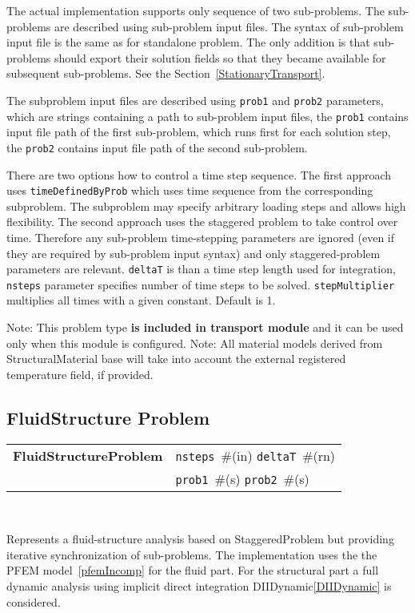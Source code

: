 \documentclass[a4paper]{article}
\makeatletter
\newcommand{\param}[1]{\texttt{#1}} %
\newcommand{\field}[2]{\param{#1}~\#{\tiny(#2)}} %
\newcommand{\entKeywordInst}[1]{\textbf{#1}} %
\newenvironment{record}[1][]{\begin{tabular}{|ll}}{\end{tabular}\\}
\newcommand{\recentry}[2]{{#1}&{#2}\\}
\newcounter{rcc}
\newenvironment{record}[1][\textwidth]{\setcounter{rcc}{0}\begin{tabular*}{#1}{|ll@{\extracolsep{\fill}}r}}{\end{tabular*}\\}
\newcommand{\recentry}[2]{\ifthenelse{\value{rcc}>0}{&$\backslash$ \\}{\setcounter{rcc}{1}}{#1}&{#2}}
\makeatother
\begin{document}
The actual implementation supports only sequence of two sub-problems.
The sub-problems are described using sub-problem input files. The
syntax of sub-problem input file is the same as for standalone
problem. The only addition is that sub-problems should export their
solution fields so that they became available for subsequent
sub-problems. See the Section~\ref{StationaryTransport}.

The subproblem input files are described using
\param{prob1} and \param{prob2} parameters, which are strings
containing a path to sub-problem input files, the \param{prob1}
contains input file path of the first sub-problem, which runs first
for each solution step, the \param{prob2} contains input file path of
the second sub-problem. 

There are two options how to control a time step sequence. The first approach
uses \param{timeDefinedByProb} which uses time sequence from the corresponding subproblem. 
The subproblem may specify arbitrary loading steps and allows high flexibility.
The second approach uses the staggered problem to take control over time. Therefore any
sub-problem time-stepping parameters are ignored (even if they are
required by sub-problem input syntax) and only staggered-problem
parameters are relevant. \param{deltaT} is than a time step length used for
integration, \param{nsteps} parameter specifies
number of time steps to be solved. \param{stepMultiplier} multiplies all 
times with a given constant. Default is 1.

Note: This problem type \textbf{is included in transport module} and it
can be used only when this module is configured.
Note: All material models derived from StructuralMaterial base will
take into account the external registered temperature field, if
provided.

\subsection{FluidStructure Problem}
\label{fluidstructureproblem}
\begin{record}
  \recentry{\entKeywordInst{FluidStructureProblem}}{\field{nsteps}{in} \field{deltaT}{rn}}
  \recentry{}{\field{prob1}{s} \field{prob2}{s}}
\end{record}

Represents a fluid-structure analysis based on StaggeredProblem but providing
iterative synchronization of sub-problems. The implementation uses the the PFEM
model~\ref{pfemIncomp} for the fluid part. For the structural part a full dynamic
analysis using implicit direct integration DIIDynamic\ref{DIIDynamic} is considered.
\end{document}
